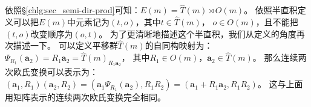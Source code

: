 依照\S\ref{chlg:sec_semi-dir-prod}可知：$E(m)= \hat{T}(m) \rtimes O(m)$。
依照半直积定义可以把$E(m)$中元素记为$(t,o)$，其中$t\in \hat{T}(m)$，
$o\in O(m)$，且不能把$(t,o)$改变顺序为$(o,t)$。
为了更清晰地描述这个半直积，我们从定义的角度再次描述一下。
可以定义平移群$\hat{T}(m)$的自同构映射为：
$\Psi_{R_1}( \boldsymbol{a}_2)=R_1 \boldsymbol{a}_2 = \hat{T}(m)_{R_1 \boldsymbol{a}_2}$，
其中$R_1 \in O(m)$，$\boldsymbol{a}_2\in \hat{T}(m)$。
那么连续两次欧氏变换可以表示为：
$(\boldsymbol{a}_1, R_1)(\boldsymbol{a}_2, R_2)=(\boldsymbol{a}_1 \Psi_{R_1}( \boldsymbol{a}_2), R_1 R_2)
=(\boldsymbol{a}_1 + R_1 \boldsymbol{a}_2 , R_1 R_2)$。
这与上面用矩阵表示的连续两次欧氏变换完全相同。





